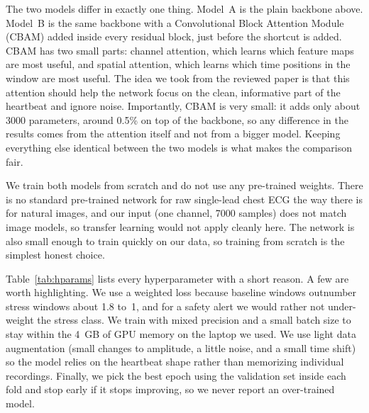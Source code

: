 \documentclass[conference]{IEEEtran}
\begin{document}
The two models differ in exactly one thing. Model~A is the plain backbone above.
Model~B is the same backbone with a Convolutional Block Attention Module (CBAM)
\cite{cbam} added inside every residual block, just before the shortcut is added.
CBAM has two small parts: channel attention, which learns which feature maps are
most useful, and spatial attention, which learns which time positions in the
window are most useful. The idea we took from the reviewed paper is that this
attention should help the network focus on the clean, informative part of the
heartbeat and ignore noise. Importantly, CBAM is very small: it adds only about
3000 parameters, around 0.5\% on top of the backbone, so any difference in the
results comes from the attention itself and not from a bigger model. Keeping
everything else identical between the two models is what makes the comparison
fair.

We train both models from scratch and do not use any pre-trained weights. There
is no standard pre-trained network for raw single-lead chest ECG the way there is
for natural images, and our input (one channel, 7000 samples) does not match
image models, so transfer learning would not apply cleanly here. The network is
also small enough to train quickly on our data, so training from scratch is the
simplest honest choice.

Table~\ref{tab:hparams} lists every hyperparameter with a short reason. A few are
worth highlighting. We use a weighted loss because baseline windows outnumber
stress windows about 1.8 to~1, and for a safety alert we would rather not
under-weight the stress class. We train with mixed precision and a small batch
size to stay within the 4~GB of GPU memory on the laptop we used. We use light
data augmentation (small changes to amplitude, a little noise, and a small time
shift) so the model relies on the heartbeat shape rather than memorizing
individual recordings. Finally, we pick the best epoch using the validation set
inside each fold and stop early if it stops improving, so we never report an
over-trained model.
\end{document}
